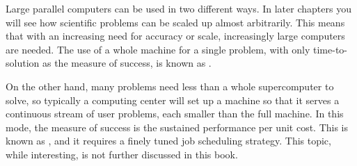 Large parallel computers can be used in two different ways. In later
chapters you will see how scientific problems can be scaled up almost
arbitrarily. This means that with an increasing need for accuracy or
scale, increasingly large computers are needed. The use of a whole
machine for a single problem, with only time-to-solution as the
measure of success, is known as .

On the other hand, many problems need less than a whole supercomputer
to solve, so typically a computing center will set up a machine so
that it serves a continuous stream of user problems, each
smaller than the full machine. In this mode, the measure of success is
the sustained performance per unit cost. This is known as
, and it requires a finely tuned job
scheduling strategy. This topic, while interesting, is not further
discussed in this book.

